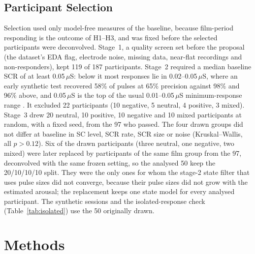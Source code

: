 \documentclass[conference]{IEEEtran}
\newcommand{\uS}{\,$\mu$S}
\begin{document}
\subsection{Participant Selection}
Selection used only model-free measures of the baseline, because film-period responding is the
outcome of H1--H3, and was fixed before the selected participants were deconvolved.
Stage~1, a quality screen set before the proposal (the dataset's EDA flag, electrode noise,
missing data, near-flat recordings and non-responders), kept 119 of 187 participants. Stage~2
required a median baseline SCR of at least 0.05\uS: below it most responses lie in
0.02--0.05\uS, where an early synthetic test recovered 58\% of pulses at 65\% precision against
98\% and 96\% above, and 0.05\uS{} is the top of the usual 0.01--0.05\uS{} minimum-response range
\cite{boucsein2012}. It excluded 22 participants (10 negative, 5 neutral, 4 positive, 3 mixed).
Stage~3 drew 20 neutral, 10 positive, 10 negative and 10 mixed participants at random, with a
fixed seed, from the 97 who passed. The four drawn groups did not differ at baseline in SC level,
SCR rate, SCR size or noise (Kruskal--Wallis, all $p > 0.12$). Six of the drawn participants (three
neutral, one negative, two mixed) were later replaced by participants of the same film group from
the 97, deconvolved with the same frozen setting, so the analysed 50 keep the 20/10/10/10 split.
They were the only ones for whom the stage-2 state filter that uses pulse sizes did not converge,
because their pulse sizes did not grow with the estimated arousal; the replacement keeps one state
model for every analysed participant.
The synthetic sessions and the isolated-response check (Table~\ref{tab:isolated}) use the 50
originally drawn.

\section{Methods}
\end{document}
